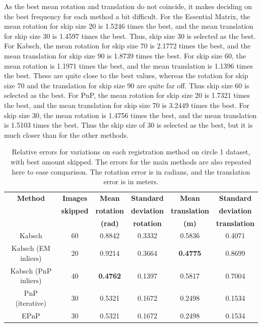 \documentclass[12pt,a4paper]{article}
\begin{document}
    As the best mean rotation and translation do not coincide, it makes deciding on the best frequency for each method a bit difficult. For the Essential Matrix, the mean rotation for skip size 20 is 1.5246 times the best, and the mean translation for skip size 30 is 1.4597 times the best. Thus, skip size 30 is selected as the best. For Kabsch, the mean rotation for skip size 70 is 2.1772 times the best, and the mean translation for skip size 90 is 1.8739 times the best. For skip size 60, the mean rotation is 1.1971 times the best, and the mean translation is 1.1396 times the best. These are quite close to the best values, whereas the rotation for skip size 70 and the translation for skip size 90 are quite far off. Thus skip size 60 is selected as the best. For PnP, the mean rotation for skip size 20 is 1.7321 times the best, and the mean translation for skip size 70 is 3.2449 times the best. For skip size 30, the mean rotation is 1.4756 times the best, and the mean translation is 1.5103 times the best. Thus the skip size of 30 is selected as the best, but it is much closer than for the other methods.

    \begin{table}[b!]
      \centering{}
      \hspace*{-1.5cm}\begin{tabular}{|c|c|c|c|c|c|}
      \hline
      \textbf{Method} & \textbf{Images}  & \textbf{Mean}       & \textbf{Standard}    & \textbf{Mean}         & \textbf{Standard} \\
      {}              & \textbf{skipped} & \textbf{rotation}   & \textbf{deviation}   & \textbf{translation}  & \textbf{deviation} \\
      {}              & {}               & \textbf{(rad)}      & \textbf{rotation}    & \textbf{(m)}          & \textbf{translation} \\
      \hline
      Kabsch & 60 & 0.8842 & 0.3332 & 0.5836 & 0.4071 \\
      \hline
      Kabsch (EM inliers) & 20 & 0.9214 & 0.3664 & \textbf{0.4775} & 0.8699 \\
      \hline
      Kabsch (PnP inliers) & 40 & \textbf{0.4762} & 0.1397 & 0.5817 & 0.7004 \\
      \hline
      PnP (iterative)  & 30 & 0.5321 & 0.1672 & 0.2498 & 0.1534 \\
      \hline
      EPnP  & 30 & 0.5321 & 0.1672 & 0.2498 & 0.1534 \\
      \hline
      \end{tabular}\hspace*{-1.5cm}
      \caption{Relative errors for variations on each registration method on circle 1 dataset, with best amount skipped. The errors for the main methods are also repeated here to ease comparison. The rotation error is in radians, and the translation error is in meters.}
      \label{t: res add rel quad}
    \end{table}
     
\end{document}
